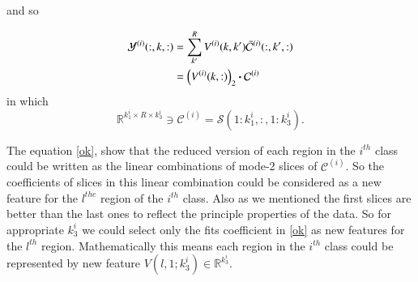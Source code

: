 \documentclass[preprint,12pt]{elsarticle}
\newcommand{\trans}{\mathsf{T}}
\begin{document}
and so

\begin{align}
\label{ok}
{\mathcal{Y}}^{(i)}(:,k,:) &= \sum_{k'}^{R} V^{(i)}(k,k')\bar{\mathcal{C}}^{(i)}(:,k',:) \notag
\\&= \left( V^{(i)}(k,:)\right)_2 \boldsymbol{\cdot} {\mathcal{C}}^{(i)}
\end{align}
in which 
\[
\mathbb{R}^{k_1^i\times R \times k_3^i}\ni {\mathcal{C}}^{(i)} = \mathcal{S}(1:k_1^i,:,1:k_3^i).
\]

The equation \eqref{ok}, show that the reduced version of each region in the $i^{th}$ class could be
written as the linear combinations of  mode-2 slices of $\mathcal{C}^{(i)}$. So the coefficients of slices in this linear combination could be considered as a new feature for the $l^{the}$ region of the $i^{th}$ class. Also as we mentioned the first slices are better than the last ones to reflect the principle properties of the data. So for appropriate $k_3^i$ we could select only the fits coefficient in \eqref{ok} as  new features for the $l^{th}$ region. Mathematically this means each region  in the $i^{th}$ class could be represented by new feature $V(l,1;k_3^i)\in \mathbb{R}^{k_3^i}$.   
\end{document}
